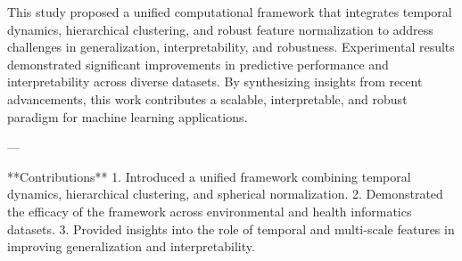 This study proposed a unified computational framework that integrates temporal dynamics, hierarchical clustering, and robust feature normalization to address challenges in generalization, interpretability, and robustness. Experimental results demonstrated significant improvements in predictive performance and interpretability across diverse datasets. By synthesizing insights from recent advancements, this work contributes a scalable, interpretable, and robust paradigm for machine learning applications.

---

**Contributions**  
1. Introduced a unified framework combining temporal dynamics, hierarchical clustering, and spherical normalization.  
2. Demonstrated the efficacy of the framework across environmental and health informatics datasets.  
3. Provided insights into the role of temporal and multi-scale features in improving generalization and interpretability.  

